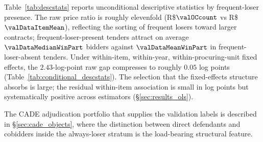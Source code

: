 Table~\ref{tab:descstats} reports unconditional descriptive
statistics by frequent-loser presence. The raw price ratio is
roughly elevenfold (R\$$\valOCcount$ vs R\$$\valDataItemMean$),
reflecting the sorting of frequent losers toward larger
contracts; frequent-loser-present tenders attract on average
$\valDataMedianWinPart$ bidders against $\valDataMeanWinPart$ in
frequent-loser-absent tenders. Under within-item, within-year,
within-procuring-unit fixed effects, the $2.43$-log-point raw
gap compresses to roughly $0.05$ log points
(Table~\ref{tab:conditional_descstats}). The selection that the
fixed-effects structure absorbs is large; the residual
within-item association is small in log points but
systematically positive across estimators
(§\ref{sec:results_ols}).



The CADE adjudication portfolio that supplies the validation
labels is described in §\ref{sec:cade_objects}, where the
distinction between direct defendants and cobidders inside the
always-loser stratum is the load-bearing structural feature.
